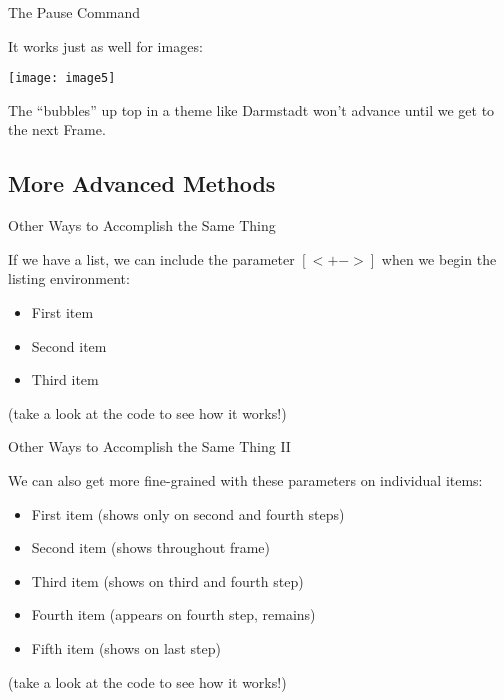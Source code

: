\documentclass{beamer}
\begin{document}
\begin{frame}{The Pause Command}

	It works just as well for images: \pause
	
	\begin{center}
	\texttt{[image: image5]}
	\end{center}	\pause
	
	The ``bubbles'' up top in a theme like Darmstadt won't advance until we get to the next Frame.

\end{frame}


\subsection{More Advanced Methods}


\begin{frame}{Other Ways to Accomplish the Same Thing}

	If we have a list, we can include the parameter $[<+->]$ when we begin the listing environment: 

	\begin{itemize}[<+->]
		\item First item
		\item Second item
		\item Third item
	\end{itemize}
	
	\vfill
	
	{\scriptsize (take a look at the code to see how it works!)}

\end{frame}


\begin{frame}{Other Ways to Accomplish the Same Thing II}

	We can also get more fine-grained with these parameters on individual items:

	\begin{itemize}
		\item<2,4> First item (shows only on second and fourth steps)
		\item<1-> Second item (shows throughout frame)
		\item<3-4> Third item (shows on third and fourth step)
		\item<4-> Fourth item (appears on fourth step, remains)
		\item<5-> Fifth item (shows on last step)
	\end{itemize}
	
	\vfill
	
	{\scriptsize (take a look at the code to see how it works!)}

\end{frame}
\end{document}
